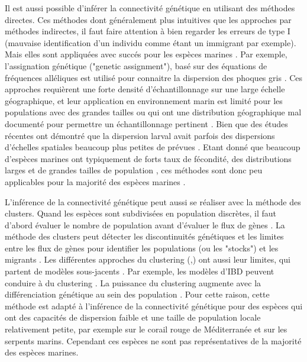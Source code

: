 \documentclass[a4paper,11pt,twoside]{report}
\begin{document}
Il est aussi possible d'inférer la connectivité génétique en utilisant des méthodes directes. Ces méthodes dont généralement plus intuitives que les approches par méthodes indirectes, il faut faire attention à bien regarder les erreurs de type I (mauvaise identification d'un individu comme étant un immigrant par exemple). Mais elles sont appliquées avec succés pour les espèces marines \citep{Gagnaire:2015aa}. Par exemple, l'assignation génétique ("genetic assignment"), basé sur des équations de fréquences alléliques est utilisé pour connaitre la dispersion des phoques gris \citep{gaggiotti2002patterns}. Ces approches requièrent une forte densité d'échantillonnage sur une large échelle géographique, et leur application en environnement marin est limité pour les populations avec des grandes tailles ou qui ont une distribution géographique mal documenté pour permettre un échantillonnage pertinent \citep{Gagnaire:2015aa}. Bien que des études récentes ont démontré que la dispersion larval avait parfois des dispersions d'échelles spatiales beaucoup plus petites de prévues \citep{almany2007local} \citep{puebla2009estimating}. Etant donné que beaucoup d'espèces marines ont typiquement de forts taux de fécondité, des distributions larges et de grandes tailles de population \citep{palumbi1994genetic}, ces méthodes sont donc peu applicables pour la majorité des espèces marines \citep{Gagnaire:2015aa}.

L'inférence de la connectivité génétique peut aussi se réaliser avec la méthode des clusters. Quand les espèces sont subdivisées en population discrètes, il faut d'abord évaluer le nombre de population avant d'évaluer le flux de gènes \citep{waples1998separating}. La méthode des clusters peut détecter les discontinuités génétiques et les limites entre les flux de gènes pour identifier les populations (ou les "stocks") et les migrants \citep{pritchard2000inference}\citep{broquet2009molecular}. Les différentes approches du clustering (\citep{pritchard2000inference},\citep{corander2003bayesian}) ont aussi leur limites, qui partent de modèles sous-jacents \citep{franccois2010spatially}. Par exemple, les modèles d'IBD peuvent conduire à du clustering \citep{aurelle2013interplay}. La puissance du clustering augmente avec la différenciation génétique au sein des population \citep{latch2006relative}. Pour cette raison, cette méthode est adapté à l'inférence de la connectivité génétique pour des espèces qui ont des capacités de dispersion faible et une taille de population locale relativement petite, par exemple \citet{ledoux2010fine} sur le corail rouge de Méditerranée et \citet{lukoschek2012sea} sur les serpents marins. Cependant ces espèces ne sont pas représentatives de la majorité des espèces marines.
\end{document}
